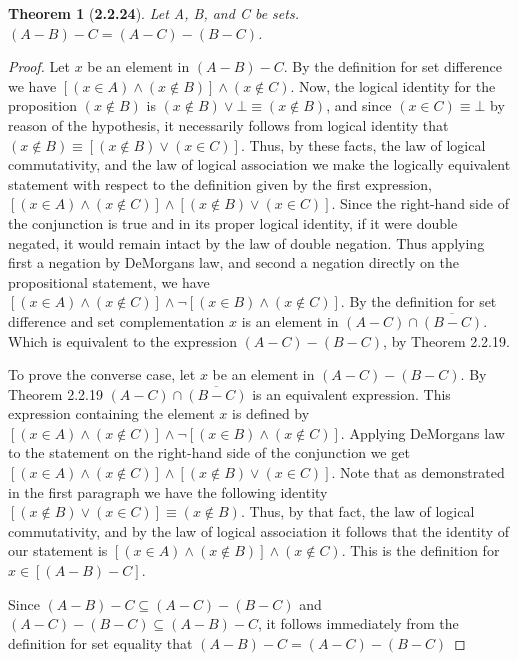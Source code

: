 \documentclass[a4paper, 12pt]{article}
\theoremstyle{plain}
\newtheorem*{theorem*}{Theorem}
\begin{document}
\pagebreak


\begin{theorem*}[\textbf{2.2.24}]
    Let A, B, and C be sets. $(A - B) - C = (A - C) - (B - C)$.
\end{theorem*}

\begin{proof}
    Let $x$ be an element in $(A - B) - C$. By the definition for set difference we have 
    $[(x \in A) \land (x \notin B)] \land (x \notin C)$.  Now, the logical identity for the 
    proposition $(x \notin B)$ is $(x \notin B) \lor \bot \equiv (x \notin B)$, and since 
    \newline $(x \in C) \equiv \bot$ by reason of the hypothesis, it necessarily follows 
    from logical identity that $(x \notin B) \equiv [(x \notin B) \lor (x \in C)]$. Thus, 
    by these facts, the law of logical commutativity, and the law of logical association we 
    make the logically equivalent statement with respect to the definition given by the first 
    expression, $[(x \in A) \land (x \notin C)] \land [(x \notin B) \lor (x \in C)]$. Since 
    the right-hand side of the conjunction is true and in its proper logical identity, if it 
    were double negated, it would remain intact by the law of double negation. Thus applying 
    first a negation by DeMorgans law, and second a negation directly on the propositional 
    statement, we have 
    $[(x \in A) \land (x \notin C)] \land \lnot [(x \in B) \land (x \notin C)]$. By the 
    definition for set difference and set complementation $x$ is an element in 
    $(A - C) \cap \overline{(B - C)}$. Which is equivalent to the expression 
    $(A - C) - (B - C)$, by Theorem 2.2.19.
    
    To prove the converse case, let $x$ be an element in $(A - C) - (B - C)$. By Theorem 2.2.19  
    $(A - C) \cap \overline{(B - C)}$ is an equivalent expression. This expression containing 
    the element $x$ is defined by 
    \newline $[(x \in A) \land (x \notin C)] \land \lnot [(x \in B) \land (x \notin C)]$. 
    Applying DeMorgans law to the statement on the right-hand side of the conjunction we get 
    \newline $[(x \in A) \land (x \notin C)] \land [(x \notin B) \lor (x \in C)]$. Note that as 
    demonstrated in the first paragraph we have the following identity 
    $[(x \notin B) \lor (x \in C)] \equiv (x \notin B)$. Thus, by that fact, the law of logical 
    commutativity, and by the law of logical association it follows that the identity of our 
    statement is \newline $[(x \in A) \land (x \notin B)] \land (x \notin C)$. This is the 
    definition for $x \in [(A - B) - C]$.
    
    Since $(A - B) - C \subseteq (A - C) - (B - C)$ and 
    \newline $(A - C) - (B - C) \subseteq (A - B) - C$, it follows immediately from the 
    definition for set equality that $(A - B) - C = (A - C) - (B - C)$
\end{proof}
\end{document}
